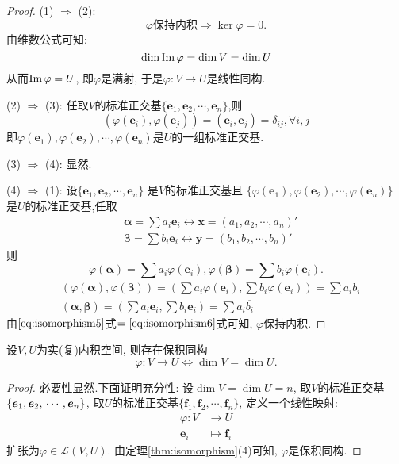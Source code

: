 \begin{proof}
    (1) $\Longrightarrow$ (2):
    \[
      \varphi\text{保持内积} \Longrightarrow \ker\varphi=0.
    \]
    由维数公式可知:
    \[
      \dim\operatorname{Im}\varphi = \dim V = \dim U
    \]
    从而$\operatorname{Im}\varphi = U$, 即$\varphi$是满射,
    于是$\varphi: V \longrightarrow U$是线性同构.

    (2) $\Longrightarrow$ (3):
    任取$V$的标准正交基$\{\bm{e}_1, \bm{e}_2, \cdots, \bm{e}_n\}$,则
    \[
       (\varphi(\bm{e}_i),\varphi(\bm{e}_j)) = (\bm{e}_i,\bm{e}_j) = \delta_{ij}, \forall i,j
     \]
      即$\varphi(\bm{e}_1), \varphi(\bm{e}_2), \cdots, \varphi(\bm{e}_n)$是$U$的一组标准正交基.
  
      (3) $\Longrightarrow$ (4): 显然.
  
      (4) $\Longrightarrow$ (1): 设$\{\bm{e}_1, \bm{e}_2, \cdots, \bm{e}_n\}$
      是$V$的标准正交基且
      $\{\varphi(\bm{e}_1), \varphi(\bm{e}_2), \cdots, \varphi(\bm{e}_n)\}$
      是$U$的标准正交基,任取
      \begin{align*}
         & \bm{\alpha}=\sum a_i\bm{e}_i \longleftrightarrow
          \bm{x}= (a_1,a_2,\cdots,a_n)'\\
        & \bm{\beta}=\sum b_i\bm{e}_i \longleftrightarrow
          \bm{y}= (b_1,b_2,\cdots,b_n)'
      \end{align*}
      则
      \[
        \varphi(\bm{\alpha}) = \sum a_i\varphi(\bm{e}_i),
        \varphi(\bm{\beta}) = \sum b_i\varphi(\bm{e}_i).
      \]
      \begin{align}
        & (\varphi(\bm{\alpha}),\varphi(\bm{\beta})) =
          (\sum a_i\varphi(\bm{e}_i),\sum b_i\varphi(\bm{e}_i)) =
          \sum a_i\overline{b_i}\label{eq:isomorphism5}\\
        & (\bm{\alpha},\bm{\beta}) =
          (\sum a_i\bm{e}_i,\sum b_i\bm{e}_i) =
          \sum a_i\overline{b_i}\label{eq:isomorphism6}
      \end{align}
      由$\eqref{eq:isomorphism5}$式$=\eqref{eq:isomorphism6}$式可知,
      $\varphi$保持内积.
\end{proof}

\begin{deduction}
  设$V, U$为实(复)内积空间, 则存在保积同构
  \[
    \varphi: V \longrightarrow U \Longleftrightarrow \dim V = \dim U. 
    \]
\end{deduction}

\begin{proof}
  必要性显然.下面证明充分性:
  设$\dim V = \dim U = n$,
  取$V$的标准正交基$\{\bm{e}_1, \bm{e}_2, \\
  \cdots,\bm{e}_n\}$,
  取$U$的标准正交基$\{\bm{f}_1, \bm{f}_2, \cdots, \bm{f}_n\}$,
  定义一个线性映射:
  \begin{align*}
    \varphi: V & \longrightarrow U\\
    \bm{e}_i & \longmapsto \bm{f}_i
  \end{align*}
  扩张为$\varphi\in \mathscr{L}(V, U)$.
  由定理\ref{thm:isomorphism}(4)可知,
  $\varphi$是保积同构.
\end{proof}

